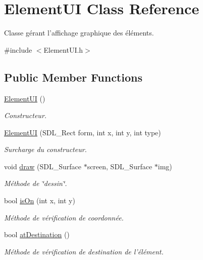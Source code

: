 \hypertarget{classElementUI}{\section{Element\-U\-I Class Reference}
\label{classElementUI}
}


Classe gérant l'affichage graphique des éléments.  




{\ttfamily \#include $<$Element\-U\-I.\-h$>$}

\subsection*{Public Member Functions}
\begin{DoxyCompactItemize}
\item 
\hyperlink{classElementUI_aba442422f66a0e5dd2c6720f49447a52}{Element\-U\-I} ()
\begin{DoxyCompactList}\small\item\em Constructeur. \end{DoxyCompactList}\item 
\hyperlink{classElementUI_a6b96a15cd508b01ba4df1fdb130e9094}{Element\-U\-I} (S\-D\-L\-\_\-\-Rect form, int x, int y, int type)
\begin{DoxyCompactList}\small\item\em Surcharge du constructeur. \end{DoxyCompactList}\item 
void \hyperlink{classElementUI_a6328f9ed38c5be1bbc40e767acc0557e}{draw} (S\-D\-L\-\_\-\-Surface $\ast$screen, S\-D\-L\-\_\-\-Surface $\ast$img)
\begin{DoxyCompactList}\small\item\em Méthode de \char`\"{}dessin\char`\"{}. \end{DoxyCompactList}\item 
bool \hyperlink{classElementUI_af050f41a37b8524b682e0fccff3532ef}{is\-On} (int x, int y)
\begin{DoxyCompactList}\small\item\em Méthode de vérification de coordonnée. \end{DoxyCompactList}\item 
bool \hyperlink{classElementUI_a08f605d10d4bcab0f62429816c20145c}{at\-Destination} ()
\begin{DoxyCompactList}\small\item\em Méthode de vérification de destination de l'élément. \end{DoxyCompactList}\item 

\end{DoxyCompactItemize}
